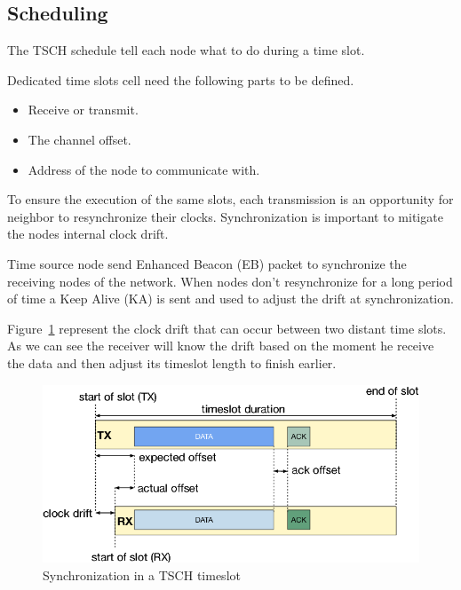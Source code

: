 \subsection{Scheduling}

The TSCH schedule tell each node what to do during a time slot.

Dedicated time slots cell need the following parts to be defined.

\begin{itemize}
  \item Receive or transmit.
  \item The channel offset.
  \item Address of the node to communicate with.
\end{itemize}


To ensure the execution of the same slots, each transmission is an opportunity 
for neighbor to resynchronize their clocks.
Synchronization is important to mitigate the nodes internal clock drift.

Time source node send Enhanced Beacon (EB) packet to synchronize the receiving
nodes of the network. When nodes don't resynchronize for a long period of time 
a Keep Alive (KA) is sent and used to adjust the drift at synchronization.

Figure~\ref{fig:sync} represent the clock drift that can occur between two
distant time slots.
As we can see the receiver will know the drift based on the moment he receive
the data and then adjust its timeslot length to finish earlier.

\begin{figure}[H]
  \centering
  \includegraphics[width=\textwidth]{thesis.tex/chapters/context/fig/sync.png}
  \caption{Synchronization in a TSCH timeslot\cite{TELESHERMETO201784}\label{fig:sync}}
\end{figure}

